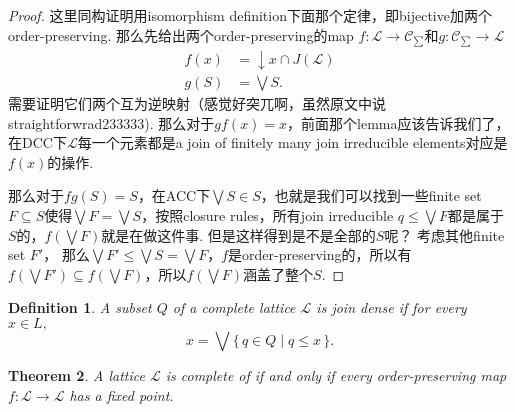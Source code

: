 \documentclass{article}
\newtheorem{theorem}{Theorem}[section]
\newtheorem{definition}[theorem]{Definition}
\newcommand*{\xfunc}[4]{{#2}\colon{#3}{#1}{#4}}
\newcommand*{\func}[3]{\xfunc{\to}{#1}{#2}{#3}}
\newcommand\Set[2]{\{\,#1\mid#2\,\}} %
\newcommand\lattice{\mathcal{L}}
\begin{document}
\begin{proof}
这里同构证明用isomorphism definition下面那个定律，即bijective加两个order-preserving. 那么先给出两个order-preserving的map $\func{f}{\lattice}{\mathcal{C}_{\sum}}$和$\func{g}{\mathcal{C}_{\sum}}{\lattice}$
$$
\begin{aligned}
f(x) &= \downarrow x \cap J(\lattice)\\
g(S) &= \bigvee S.
\end{aligned}
$$
需要证明它们两个互为逆映射（感觉好突兀啊，虽然原文中说straightforwrad233333). 那么对于$gf(x) = x$，前面那个lemma应该告诉我们了，在DCC下$\lattice$每一个元素都是a join of finitely many join irreducible elements对应是$f(x)$的操作. 

那么对于$fg(S) = S$，在ACC下$\bigvee S \in S$，也就是我们可以找到一些finite set $F \subseteq S$使得$\bigvee F = \bigvee S$，按照closure rules，所有join irreducible $q \leq \bigvee F$都是属于$S$的，$f(\bigvee F)$就是在做这件事. 但是这样得到是不是全部的$S$呢？ 考虑其他finite set $F'$， 那么$\bigvee F' \leq \bigvee S = \bigvee F$，$f$是order-preserving的，所以有$f(\bigvee F') \subseteq f(\bigvee F)$，所以$f(\bigvee F)$涵盖了整个$S$.
\end{proof}

\begin{definition}
\rm A subset $Q$ of a complete lattice $\lattice$ is join dense if for every $x \in L,$
$$
x = \bigvee\Set{q \in Q}{q \leq x}.
$$
\end{definition}


\begin{theorem}
\rm A lattice $\lattice$ is complete of if and only if every order-preserving map $\func{f}{\lattice}{\lattice}$ has a fixed point.
\end{theorem}
\end{document}
